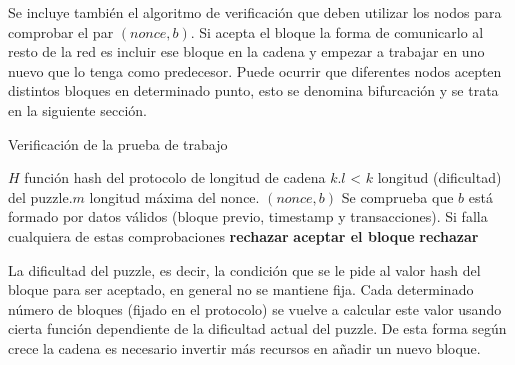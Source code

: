 Se incluye también el algoritmo de verificación que deben utilizar los nodos para comprobar el par $(nonce, b)$. Si acepta el bloque la forma de comunicarlo al resto de la red es incluir ese bloque en la cadena y empezar a trabajar en uno nuevo que lo tenga como predecesor. Puede ocurrir que diferentes nodos acepten distintos bloques en determinado punto, esto se denomina bifurcación y se trata en la siguiente sección.
\begin{algorithm}
\caption{Verificación de la prueba de trabajo}\label{alg:pow_check}
\begin{algorithmic}[1]
\Require \Statex $H$ función hash del protocolo de longitud de cadena $k$.\Statex $l$ < $k$ longitud (dificultad) del puzzle.\Statex $m$ longitud máxima del nonce. \Statex $(nonce, b)$
\State Se comprueba que $b$ está formado por datos válidos (bloque previo, timestamp y transacciones). Si falla cualquiera de estas comprobaciones \textbf{rechazar}
 \Return \textbf{aceptar el bloque}
\Else  \textbf{ rechazar}
\EndIf
\end{algorithmic}
\end{algorithm}

\begin{figure}[H]
  \qquad
	\label{fig:flux}%
\end{figure}

La dificultad del puzzle, es decir, la condición que se le pide al valor hash del bloque para ser aceptado, en general no se mantiene fija. Cada determinado número de bloques (fijado en el protocolo) se vuelve a calcular este valor usando cierta función dependiente de la dificultad actual del puzzle. De esta forma según crece la cadena es necesario invertir más recursos en añadir un nuevo bloque.


